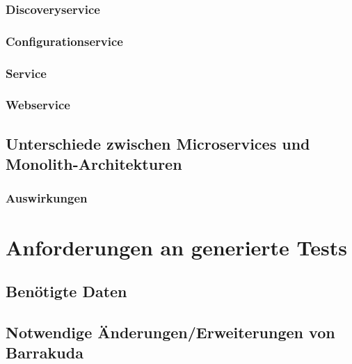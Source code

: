 \documentclass[12pt,a4paper,bibliography=totocnumbered,listof=totocnumbered]{scrartcl}
\begin{document}
\subsubsection{Discoveryservice}

\subsubsection{Configurationservice}

\subsubsection{Service}

\subsubsection{Webservice}

\subsection{Unterschiede zwischen Microservices und Monolith-Architekturen}

\subsubsection{Auswirkungen}

\section{Anforderungen an generierte Tests}

\subsection{Benötigte Daten}

\subsection{Notwendige Änderungen/Erweiterungen von Barrakuda}

\end{document}
